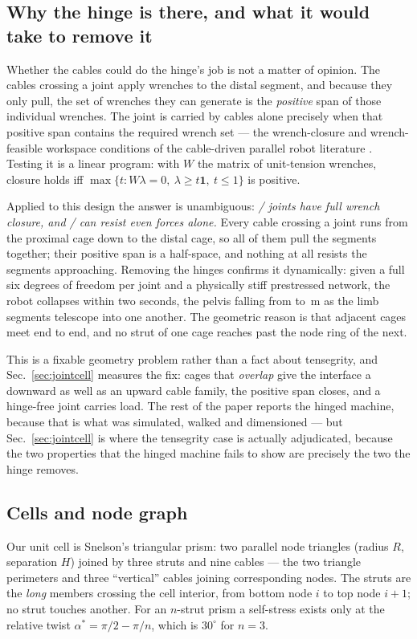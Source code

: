 \documentclass[conference]{IEEEtran}
\begin{document}
\subsection{Why the hinge is there, and what it would take to remove it}
\label{sec:hinge}
Whether the cables could do the hinge's job is not a matter of opinion. The
cables crossing a joint apply wrenches to the distal segment, and because they
only pull, the set of wrenches they can generate is the \emph{positive} span
of those individual wrenches. The joint is carried by cables alone precisely
when that positive span contains the required wrench set --- the wrench-closure
and wrench-feasible workspace conditions of the cable-driven parallel robot
literature \cite{bosscher2004wrench,gouttefarde2006wrench,gouttefarde2007wfw}.
Testing it is a linear program: with $W$ the matrix of unit-tension wrenches,
closure holds iff $\max\{t : W\lambda = 0,\ \lambda \ge t\mathbf{1},\ t\le1\}$
is positive.

Applied to this design the answer is unambiguous: \emph{\wcSix/\wcTotal{}
joints have full wrench closure, and \wcThree/\wcTotal{} can resist even
forces alone.} Every cable crossing a joint runs from the proximal cage down
to the distal cage, so all of them pull the segments together; their positive
span is a half-space, and nothing at all resists the segments approaching.
Removing the hinges confirms it dynamically: given a full six degrees of
freedom per joint and a physically stiff prestressed network, the robot
collapses within two seconds, the pelvis falling from
\freeZstart{} to \freeZend\,m as the limb segments telescope into one another.
The geometric reason is that adjacent cages meet end to end, and no strut of
one cage reaches past the node ring of the next.

This is a fixable geometry problem rather than a fact about tensegrity, and
Sec.~\ref{sec:jointcell} measures the fix: cages that \emph{overlap} give the
interface a downward as well as an upward cable family, the positive span
closes, and a hinge-free joint carries load. The rest of the paper reports the
hinged machine, because that is what was simulated, walked and dimensioned ---
but Sec.~\ref{sec:jointcell} is where the tensegrity case is actually
adjudicated, because the two properties that the hinged machine fails to show
are precisely the two the hinge removes.

\subsection{Cells and node graph}
Our unit cell is Snelson's triangular prism: two parallel node triangles
(radius $R$, separation $H$) joined by three struts and nine cables --- the
two triangle perimeters and three ``vertical'' cables joining corresponding
nodes. The struts are the \emph{long} members crossing the cell interior, from
bottom node $i$ to top node $i{+}1$; no strut touches another. For an
$n$-strut prism a self-stress exists only at the relative twist
$\alpha^\ast=\pi/2-\pi/n$, which is $30^\circ$ for $n=3$.
\end{document}
